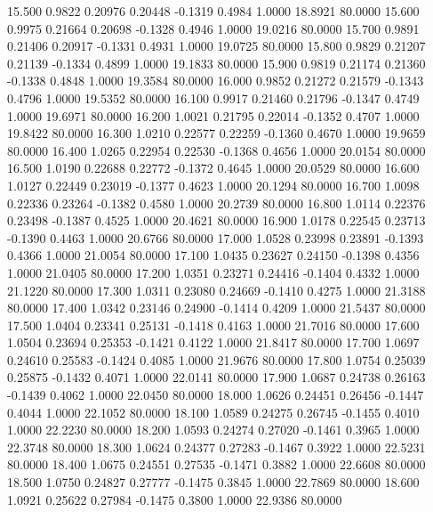  15.500   0.9822   0.20976   0.20448  -0.1319   0.4984   1.0000  18.8921  80.0000
  15.600   0.9975   0.21664   0.20698  -0.1328   0.4946   1.0000  19.0216  80.0000
  15.700   0.9891   0.21406   0.20917  -0.1331   0.4931   1.0000  19.0725  80.0000
  15.800   0.9829   0.21207   0.21139  -0.1334   0.4899   1.0000  19.1833  80.0000
  15.900   0.9819   0.21174   0.21360  -0.1338   0.4848   1.0000  19.3584  80.0000
  16.000   0.9852   0.21272   0.21579  -0.1343   0.4796   1.0000  19.5352  80.0000
  16.100   0.9917   0.21460   0.21796  -0.1347   0.4749   1.0000  19.6971  80.0000
  16.200   1.0021   0.21795   0.22014  -0.1352   0.4707   1.0000  19.8422  80.0000
  16.300   1.0210   0.22577   0.22259  -0.1360   0.4670   1.0000  19.9659  80.0000
  16.400   1.0265   0.22954   0.22530  -0.1368   0.4656   1.0000  20.0154  80.0000
  16.500   1.0190   0.22688   0.22772  -0.1372   0.4645   1.0000  20.0529  80.0000
  16.600   1.0127   0.22449   0.23019  -0.1377   0.4623   1.0000  20.1294  80.0000
  16.700   1.0098   0.22336   0.23264  -0.1382   0.4580   1.0000  20.2739  80.0000
  16.800   1.0114   0.22376   0.23498  -0.1387   0.4525   1.0000  20.4621  80.0000
  16.900   1.0178   0.22545   0.23713  -0.1390   0.4463   1.0000  20.6766  80.0000
  17.000   1.0528   0.23998   0.23891  -0.1393   0.4366   1.0000  21.0054  80.0000
  17.100   1.0435   0.23627   0.24150  -0.1398   0.4356   1.0000  21.0405  80.0000
  17.200   1.0351   0.23271   0.24416  -0.1404   0.4332   1.0000  21.1220  80.0000
  17.300   1.0311   0.23080   0.24669  -0.1410   0.4275   1.0000  21.3188  80.0000
  17.400   1.0342   0.23146   0.24900  -0.1414   0.4209   1.0000  21.5437  80.0000
  17.500   1.0404   0.23341   0.25131  -0.1418   0.4163   1.0000  21.7016  80.0000
  17.600   1.0504   0.23694   0.25353  -0.1421   0.4122   1.0000  21.8417  80.0000
  17.700   1.0697   0.24610   0.25583  -0.1424   0.4085   1.0000  21.9676  80.0000
  17.800   1.0754   0.25039   0.25875  -0.1432   0.4071   1.0000  22.0141  80.0000
  17.900   1.0687   0.24738   0.26163  -0.1439   0.4062   1.0000  22.0450  80.0000
  18.000   1.0626   0.24451   0.26456  -0.1447   0.4044   1.0000  22.1052  80.0000
  18.100   1.0589   0.24275   0.26745  -0.1455   0.4010   1.0000  22.2230  80.0000
  18.200   1.0593   0.24274   0.27020  -0.1461   0.3965   1.0000  22.3748  80.0000
  18.300   1.0624   0.24377   0.27283  -0.1467   0.3922   1.0000  22.5231  80.0000
  18.400   1.0675   0.24551   0.27535  -0.1471   0.3882   1.0000  22.6608  80.0000
  18.500   1.0750   0.24827   0.27777  -0.1475   0.3845   1.0000  22.7869  80.0000
  18.600   1.0921   0.25622   0.27984  -0.1475   0.3800   1.0000  22.9386  80.0000
